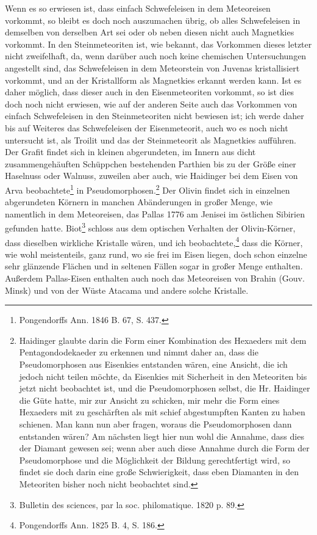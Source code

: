 \documentclass[a4paper, 11pt, oneside]{article}
\begin{document}
Wenn es so erwiesen ist, dass einfach Schwefeleisen in dem Meteoreisen vorkommt, so bleibt es doch noch auszumachen übrig, ob alles Schwefeleisen in demselben von derselben Art sei oder ob neben diesen nicht auch Magnetkies vorkommt. In den Steinmeteoriten ist, wie bekannt, das Vorkommen dieses letzter nicht zweifelhaft, da, wenn darüber auch noch keine chemischen Untersuchungen angestellt sind, das Schwefeleisen in dem Meteorstein von Juvenas kristallisiert vorkommt, und an der Kristallform als Magnetkies erkannt werden kann. Ist es daher möglich, dass dieser auch in den Eisenmeteoriten vorkommt, so ist dies doch noch nicht erwiesen, wie auf der anderen Seite auch das Vorkommen von einfach Schwefeleisen in den Steinmeteoriten nicht bewiesen ist; ich werde daher bis auf Weiteres das Schwefeleisen der Eisenmeteorit, auch wo es noch nicht untersucht ist, als Troilit und das der Steinmeteorit als Magnetkies aufführen. Der Grafit findet sich in kleinen abgerundeten, im Innern aus dicht zusammengehäuften Schüppchen bestehenden Parthien bis zu der Größe einer Haselnuss oder Walnuss, zuweilen aber auch, wie Haidinger bei dem Eisen von Arva beobachtete\footnote{Pongendorffs Ann. 1846 B. 67, S. 437.} in Pseudomorphosen.\footnote{Haidinger glaubte darin die Form einer Kombination des Hexaeders mit dem Pentagondodekaeder zu erkennen und nimmt daher an, dass die Pseudomorphosen aus Eisenkies entstanden wären, eine Ansicht, die ich jedoch nicht teilen möchte, da Eisenkies mit Sicherheit in den Meteoriten bis jetzt nicht beobachtet ist, und die Pseudomorphosen selbst, die Hr. Haidinger die Güte hatte, mir zur Ansicht zu schicken, mir mehr die Form eines Hexaeders mit zu geschärften als mit schief abgestumpften Kanten zu haben schienen. Man kann nun aber fragen, woraus die Pseudomorphosen dann entstanden wären? Am nächsten liegt hier nun wohl die Annahme, dass dies der Diamant gewesen sei; wenn aber auch diese Annahme durch die Form der Pseudomorphose und die Möglichkeit der Bildung gerechtfertigt wird, so findet sie doch darin eine große Schwierigkeit, dass eben Diamanten in den Meteoriten bisher noch nicht beobachtet sind.} Der Olivin findet sich in einzelnen abgerundeten Körnern in manchen Abänderungen in großer Menge, wie namentlich in dem Meteoreisen, das Pallas 1776 am Jenisei im östlichen Sibirien gefunden hatte. Biot\footnote{Bulletin des sciences, par la soc. philomatique. 1820 p. 89.} schloss aus dem optischen Verhalten der Olivin-Körner, dass dieselben wirkliche Kristalle wären, und ich beobachtete,\footnote{Pongendorffs Ann. 1825 B. 4, S. 186.} dass die Körner, wie wohl meistenteils, ganz rund, wo sie frei im Eisen liegen, doch schon einzelne sehr glänzende Flächen und in seltenen Fällen sogar in großer Menge enthalten. Außerdem Pallas-Eisen enthalten auch noch das Meteoreisen von Brahin (Gouv. Minsk) und von der Wüste Atacama und andere solche Kristalle.
\end{document}
